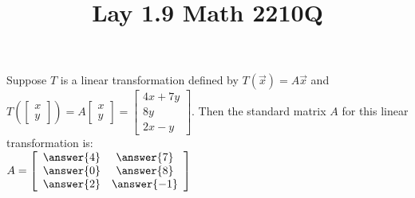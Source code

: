 \documentclass{ximera}
\begin{document}
  	\title{Lay 1.9  \hfill Math 2210Q} 

  	
  
 
	\begin{question}
		Suppose $T$ is a linear transformation defined by $T(\vec{x}) = A\vec{x}$ and $T\left(\begin{bmatrix} x\\ y \end{bmatrix}\right) = A\begin{bmatrix} x\\ y \end{bmatrix} =\begin{bmatrix} 4x+7y \\ 8y \\ 2x-y \end{bmatrix}$. Then the standard matrix $A$ for this linear transformation is:\\
		
		$A = \left[\begin{array}{cc} \answer{4} & \answer{7} \\\answer{0} &\answer{8} \\ \answer{2} &\answer{-1} \end{array}\right]$
	\end{question}
	
\end{document}
